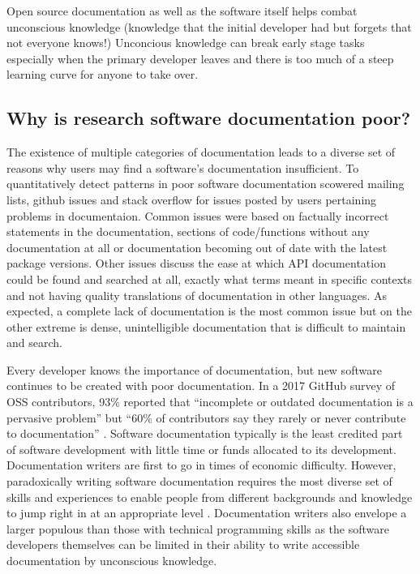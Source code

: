 \documentclass[../main.tex]{subfiles}
\begin{document}

Open source documentation as well as the software itself helps combat unconscious knowledge (knowledge that the initial developer had but forgets that not everyone knows!) Unconcious knowledge can break early stage tasks especially when the primary developer leaves and there is too much of a steep learning curve for anyone to take over.  


\subsection{Why is research software documentation poor?}

The existence of multiple categories of documentation leads to a diverse set of reasons why users may find a software’s documentation insufficient.
To quantitatively detect patterns in poor software documentation \cite{Aghajani2019} scowered mailing lists, github issues and stack overflow for issues posted by users pertaining problems in documentaion. 
Common issues were based on factually incorrect statements in the documentation, sections of code/functions without any documentation at all or documentation becoming out of date with the latest package versions.
Other issues discuss the ease at which API documentation could be found and searched at all, exactly what terms meant in specific contexts and not having quality translations of documentation in other languages.
As expected, a complete lack of documentation is the most common issue but on the other extreme is dense, unintelligible documentation that is difficult to maintain and search.

Every developer knows the importance of documentation, but new software continues to be created with poor documentation.
In a 2017 GitHub survey of OSS contributors, 93\% reported that “incomplete or outdated documentation is a pervasive problem” but “60\% of contributors say they rarely or never contribute to documentation” \cite{Geiger2017}.
Software documentation typically is the least credited part of software development with little time or funds allocated to its development.
Documentation writers are first to go in times of economic difficulty. \cite{Forward2002}
However, paradoxically writing software documentation requires the most diverse set of skills and experiences to enable people from different backgrounds and knowledge to jump right in at an appropriate level \cite{Geiger2018}.
Documentation writers also envelope a larger populous than those with technical programming skills as the software developers themselves can be limited in their ability to write accessible documentation by unconscious knowledge.
\end{document}
